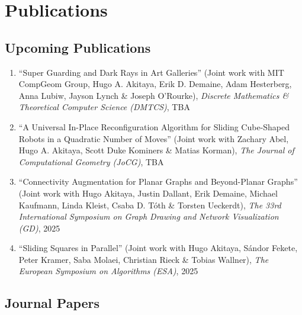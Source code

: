 \documentclass[letterpaper,11pt]{article}
\makeatletter
\newcommand{\resumeSubHeadingListStart}{\begin{itemize}[leftmargin=*]}
\newcommand{\resumeSubHeadingListEnd}{\end{itemize}}
\newcommand{\publication}[6]{
  \item ``#1'' %
   (Joint work with#2), %
     \emph{#3}, %
      #4%


}
\makeatother
\begin{document}
\section{Publications}


    \subsection*{Upcoming Publications}%
  
    \begin{enumerate}
    \setcounter{enumi}{\value{pubnum}}
      
        \publication
          {Super Guarding and Dark Rays in Art Galleries}
          {
 MIT CompGeom Group, Hugo A. Akitaya, Erik D. Demaine, Adam Hesterberg, Anna Lubiw, Jayson Lynch \& Joseph O'Rourke}
          {Discrete Mathematics \& Theoretical Computer Science (DMTCS)}
          {TBA}
          {%
%
%
%
          }
          {1}
 \vspace{-.5em}  
      
        \publication
          {A Universal In-Place Reconfiguration Algorithm for Sliding Cube-Shaped Robots in a Quadratic Number of Moves}
          {
 Zachary Abel, Hugo A. Akitaya, Scott Duke Kominers \& Matias Korman}
          {The Journal of Computational Geometry (JoCG)}
          {TBA}
          {%
%
%
%
          }
          {2}
 \vspace{-.5em}  
      
        \publication
          {Connectivity Augmentation for Planar Graphs and Beyond-Planar Graphs}
          {
 Hugo Akitaya, Justin Dallant, Erik Demaine, Michael Kaufmann, Linda Kleist, Csaba D. Tóth \& Torsten Ueckerdt}
          {The 33rd International Symposium on Graph Drawing and Network Visualization (GD)}
          {2025}
          {%
%
%
%
          }
          {3}
 \vspace{-.5em}  
      
        \publication
          {Sliding Squares in Parallel}
          {
 Hugo Akitaya, Sándor Fekete, Peter Kramer, Saba Molaei, Christian Rieck \& Tobias Wallner}
          {The European Symposium on Algorithms (ESA)}
          {2025}
          {%
%
%
%
          }
          {4}
 
    \setcounter{pubnum}{\value{enumi}}
    \end{enumerate}
    \subsection*{Journal Papers}%
  
\end{document}
